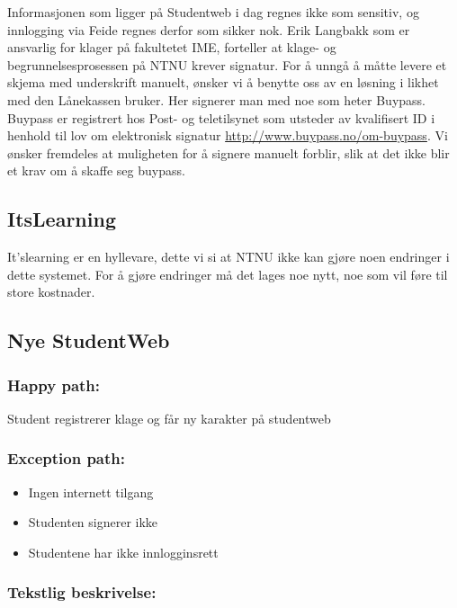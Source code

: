 \documentclass[12pt]{article}
\begin{document}
Informasjonen som ligger på Studentweb i dag regnes ikke som sensitiv, og innlogging via Feide regnes derfor som sikker nok. Erik Langbakk som er ansvarlig for klager på fakultetet IME, forteller at klage- og begrunnelsesprosessen på NTNU krever signatur. For å unngå å måtte levere et skjema med underskrift manuelt, ønsker vi å benytte oss av en løsning i likhet med den Lånekassen bruker. Her signerer man med noe som heter Buypass. Buypass er registrert hos Post- og teletilsynet som utsteder av kvalifisert ID i henhold til lov om elektronisk signatur \url{http://www.buypass.no/om-buypass}. Vi ønsker fremdeles at muligheten for å signere manuelt forblir, slik at det ikke blir et krav om å skaffe seg buypass.


\subsection*{ItsLearning}
It’slearning er en hyllevare, dette vi si at NTNU ikke kan gjøre noen endringer i dette systemet. For å gjøre endringer må det lages noe nytt, noe som vil føre til store kostnader.


\subsection{Nye StudentWeb}

\subsubsection*{Happy path:}

Student registrerer klage og får ny karakter på studentweb

\subsubsection*{Exception path:}

\begin{itemize}
\item Ingen internett tilgang
\item Studenten signerer ikke
\item Studentene har ikke innlogginsrett
\end{itemize}

\subsubsection*{Tekstlig beskrivelse:}
\end{document}
